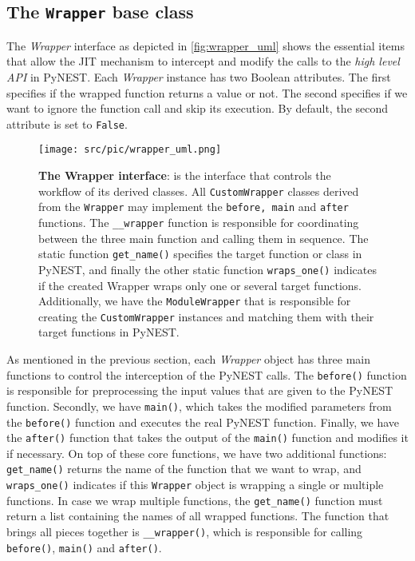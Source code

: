 \subsection{The \texttt{Wrapper} base class}

The \emph{Wrapper} interface as depicted in \autoref{fig:wrapper_uml} shows the essential items that allow the JIT mechanism to intercept and modify the calls to the \emph{high level API} in PyNEST. Each \emph{Wrapper} instance has two Boolean attributes. The first specifies if the wrapped function returns a value or not. The second specifies if we want to ignore the function call and skip its execution. By default, the second attribute is set to \texttt{False}.

\begin{figure}[ht!]
\centering
\texttt{[image: src/pic/wrapper\_uml.png]}
\caption{\textbf{The Wrapper interface}: is the interface that controls the workflow of its derived classes. All \texttt{CustomWrapper} classes derived from the \texttt{Wrapper} may implement the \texttt{before, main} and \texttt{after} functions. The \texttt{\_\_wrapper} function is responsible for coordinating between the three main function and calling them in sequence. The static function \texttt{get\_name()} specifies the target function or class in PyNEST, and finally the other static function \texttt{wraps\_one()} indicates if the created Wrapper wraps only one or several target functions. Additionally, we have the \texttt{ModuleWrapper} that is responsible for creating the \texttt{CustomWrapper} instances and matching them with their target functions in PyNEST.}
\label{fig:wrapper_uml}
\end{figure}

As mentioned in the previous section, each \emph{Wrapper} object has three main functions to control the interception of the PyNEST calls. The \texttt{before()} function is responsible for preprocessing the input values that are given to the PyNEST function. Secondly, we have \texttt{main()}, which takes the modified parameters from the \texttt{before()} function and executes the real PyNEST function. Finally, we have the \texttt{after()} function that takes the output of the \texttt{main()} function and modifies it if necessary. On top of these core functions, we have two additional functions: \texttt{get\_name()} returns the name of the function that we want to wrap, and \texttt{wraps\_one()} indicates if this \texttt{Wrapper} object is wrapping a single or multiple functions. In case we wrap multiple functions, the \texttt{get\_name()} function must return a list containing the names of all wrapped functions. The function that brings all pieces together is \texttt{\_\_wrapper()}, which is responsible for calling \texttt{before()}, \texttt{main()} and \texttt{after()}.

